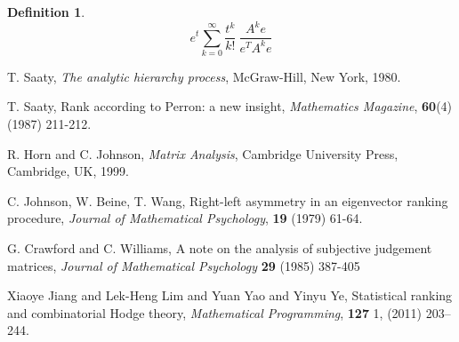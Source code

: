 \documentclass[a4,11pt,twoside,leqno]{report}
\theoremstyle{definition}
\newtheorem{defn}[thm]{Definition}
\theoremstyle{remark}
\numberwithin{equation}{section}
\begin{document}
\begin{defn} 

$$e^t \displaystyle \sum_{k=0}^{\infty} \frac{t^k}{k!} \ \frac{A^ke}{e^TA^ke}$$

\end{defn}

\begin{thebibliography}{1}

   T. Saaty, {\em The analytic hierarchy process}, McGraw-Hill, New York, 1980. 
  
   T. Saaty, Rank according to Perron: a new insight, {\em Mathematics Magazine}, {\bf 60}(4) (1987) 211-212.

   R. Horn and C. Johnson, {\em Matrix Analysis}, Cambridge University Press, Cambridge, UK, 1999.

   C. Johnson, W. Beine, T. Wang, Right-left asymmetry in an eigenvector ranking procedure, {\em Journal of Mathematical Psychology}, {\bf 19} (1979) 61-64.
  
   G. Crawford and C. Williams, A note on the analysis of subjective judgement matrices, {\em Journal of Mathematical Psychology} {\bf 29} (1985) 387-405
  
   Xiaoye Jiang and Lek-Heng Lim and Yuan Yao and
Yinyu Ye, Statistical ranking and combinatorial Hodge theory, \emph{Mathematical
Programming}, \textbf{127} 1, (2011) 203--244. 
  
  
  
  
   
  




  \end{thebibliography}
\end{document}
